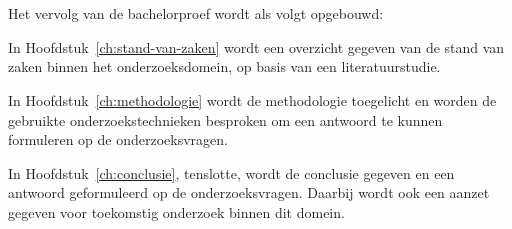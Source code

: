 \section{}
\label{sec:opzet-bachelorproef}


Het vervolg van de bachelorproef wordt als volgt opgebouwd:

In Hoofdstuk~\ref{ch:stand-van-zaken} wordt een overzicht gegeven van de stand van zaken binnen het onderzoeksdomein, op basis van een literatuurstudie.

In Hoofdstuk~\ref{ch:methodologie} wordt de methodologie toegelicht en worden de gebruikte onderzoekstechnieken besproken om een antwoord te kunnen formuleren op de onderzoeksvragen.


In Hoofdstuk~\ref{ch:conclusie}, tenslotte, wordt de conclusie gegeven en een antwoord geformuleerd op de onderzoeksvragen. Daarbij wordt ook een aanzet gegeven voor toekomstig onderzoek binnen dit domein.